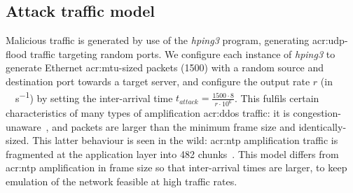 \subsection{Attack traffic model}\label{sec:attack-traffic-model}
Malicious traffic is generated by use of the \emph{hping3} program, generating \gls{acr:udp}-flood traffic targeting random ports.
We configure each instance of \emph{hping3} to generate Ethernet \gls{acr:mtu}-sized packets (\qty{1500}{\byte}) with a random source and destination port towards a target server, and configure the output rate $r$ (in \unit{\mega\bit\per\second}) by setting the inter-arrival time $t_{\mathit{attack}}=\frac{1500 \cdot 8}{r\cdot10^6}$.
This fulfils certain characteristics of many types of amplification \gls{acr:ddos} traffic: it is congestion-unaware~\parencite{DBLP:conf/ndss/Rossow14}, and packets are larger than the minimum frame size and identically-sized.
This latter behaviour is seen in the wild: \gls{acr:ntp} amplification traffic is fragmented at the application layer into \qty{482}{\byte} chunks~\parencite{cisco-ntp-amp}.
This model differs from \gls{acr:ntp} amplification in frame size so that inter-arrival times are larger, to keep emulation of the network feasible at high traffic rates.